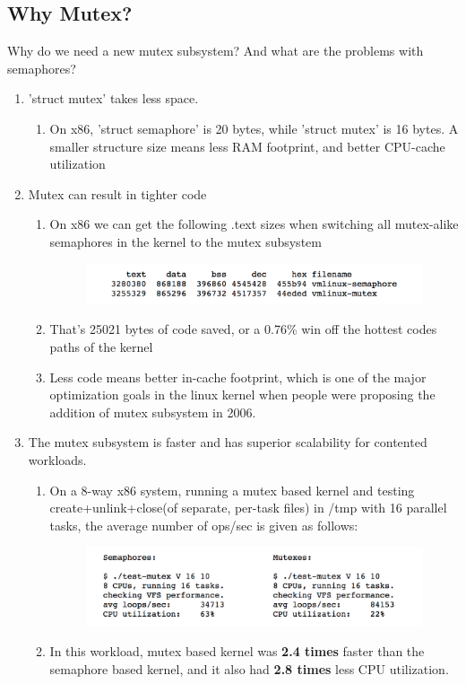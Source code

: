 \documentclass[10pt]{sigplanconf}
\begin{document}
\subsection{Why Mutex?}
Why do we need a new mutex subsystem? And what are the problems with semaphores?\\
\begin{enumerate}
	\item 'struct mutex' takes less space.
	\begin{enumerate}
		\item On x86, 'struct semaphore' is 20 bytes, while 'struct mutex' is 16 bytes. A smaller structure size means less RAM footprint, and better CPU-cache utilization
	\end{enumerate}
	\item Mutex can result in tighter code
	\begin{enumerate}
		\item On x86 we can get the following .text sizes when switching all mutex-alike semaphores in the kernel to the mutex subsystem
		\begin{figure}[h!]
			\includegraphics[scale=0.5]{image00.png}
		\end{figure}
		\item That's 25021 bytes of code saved, or a 0.76\% win off the hottest codes paths of the kernel
		\item Less code means better in-cache footprint, which is one of the major optimization goals in the linux kernel when people were proposing the addition of mutex subsystem in 2006. 
	\end{enumerate}
	\item The mutex subsystem is faster and has superior scalability for contented workloads.
	\begin{enumerate}
		\item On a 8-way x86 system, running a mutex based kernel and testing create+unlink+close(of separate, per-task files) in /tmp with 16 parallel tasks, the average number of ops/sec is given as follows:
		\begin{figure}[h!]
			\includegraphics[scale=0.5]{image01.png}
		\end{figure}
		\item In this workload, mutex based kernel was \textbf{2.4 times} faster than the semaphore based kernel, and it also had \textbf{2.8 times} less CPU utilization. 
	\end{enumerate}
\end{enumerate}
\end{document}

